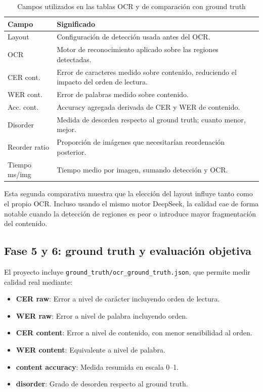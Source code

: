 \documentclass[11pt, a4paper]{article}
\begin{document}
\begin{table}[H]
\centering
\caption{Campos utilizados en las tablas OCR y de comparaci\'on con ground truth}
\small
\begin{tabular}{p{3.4cm} p{10.1cm}}
\toprule
\textbf{Campo} & \textbf{Significado} \\
\midrule
Layout & Configuraci\'on de detecci\'on usada antes del OCR. \\
OCR & Motor de reconocimiento aplicado sobre las regiones detectadas. \\
CER cont. & Error de caracteres medido sobre contenido, reduciendo el impacto del orden de lectura. \\
WER cont. & Error de palabras medido sobre contenido. \\
Acc. cont. & Accuracy agregada derivada de CER y WER de contenido. \\
Disorder & Medida de desorden respecto al ground truth; cuanto menor, mejor. \\
Reorder ratio & Proporci\'on de im\'agenes que necesitar\'ian reordenaci\'on posterior. \\
Tiempo ms/img & Tiempo medio por imagen, sumando detecci\'on y OCR. \\
\bottomrule
\end{tabular}
\normalsize
\end{table}

Esta segunda comparativa muestra que la elecci\'on del layout influye tanto como el propio OCR.
Incluso usando el mismo motor DeepSeek, la calidad cae de forma notable cuando la detecci\'on de
regiones es peor o introduce mayor fragmentaci\'on del contenido.

\subsection{Fase 5 y 6: ground truth y evaluaci\'on objetiva}

El proyecto incluye \texttt{ground\_truth/ocr\_ground\_truth.json}, que permite medir calidad real
mediante:

\begin{itemize}
    \item \textbf{CER raw}: Error a nivel de car\'acter incluyendo orden de lectura.
    \item \textbf{WER raw}: Error a nivel de palabra incluyendo orden.
    \item \textbf{CER content}: Error a nivel de contenido, con menor sensibilidad al orden.
    \item \textbf{WER content}: Equivalente a nivel de palabra.
    \item \textbf{content accuracy}: Medida resumida en escala 0--1.
    \item \textbf{disorder}: Grado de desorden respecto al ground truth.
\end{itemize}
\end{document}
